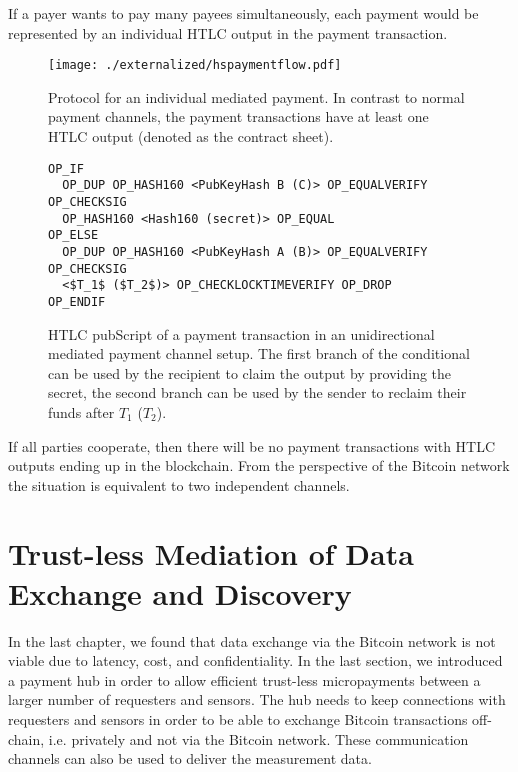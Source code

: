 If a payer wants to pay many payees simultaneously, each payment would be represented by an individual \ac{HTLC} output in the payment transaction.

\begin{figure}
\centering
\texttt{[image: ./externalized/hspaymentflow.pdf]}
\caption{Protocol for an individual mediated payment. In contrast to normal payment channels, the payment transactions have at least one \ac{HTLC} output (denoted as the contract sheet).}
\label{fig:unimedpc}
\end{figure}

\begin{figure}
\begin{lstlisting}[breaklines,mathescape=true]
OP_IF
  OP_DUP OP_HASH160 <PubKeyHash B (C)> OP_EQUALVERIFY OP_CHECKSIG
  OP_HASH160 <Hash160 (secret)> OP_EQUAL
OP_ELSE
  OP_DUP OP_HASH160 <PubKeyHash A (B)> OP_EQUALVERIFY OP_CHECKSIG
  <$T_1$ ($T_2$)> OP_CHECKLOCKTIMEVERIFY OP_DROP
OP_ENDIF
\end{lstlisting} 
\caption{\ac{HTLC} pubScript of a payment transaction in an unidirectional mediated payment channel setup. The first branch of the conditional can be used by the recipient to claim the output by providing the secret, the second branch can be used by the sender to reclaim their funds after $T_1$ ($T_2$).}
\label{fig:pubScriptHTLC}
\end{figure}

If all parties cooperate, then there will be no payment transactions with \ac{HTLC} outputs ending up in the blockchain. From the perspective of the Bitcoin network the situation is equivalent to two independent channels.

\section{Trust-less Mediation of Data Exchange and Discovery}
\label{sec:trust-lessexchange}

In the last chapter, we found that data exchange via the Bitcoin network is not viable due to latency, cost, and confidentiality. In the last section, we introduced a payment hub in order to allow efficient trust-less micropayments between a larger number of requesters and sensors. The hub needs to keep connections with requesters and sensors in order to be able to exchange Bitcoin transactions off-chain, i.e. privately and not via the Bitcoin network. These communication channels can also be used to deliver the measurement data.

